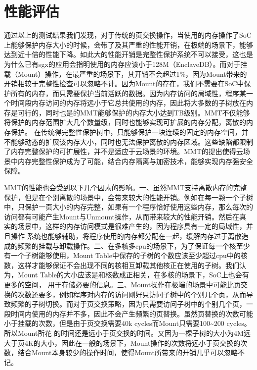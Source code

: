 \section{性能评估}
通过以上的测试结果我们发现，对于传统的页交换操作，当使用的内存操作了SoC上能够保护内存大小的时候，会带了及其严重的性能开销，在极端的场景下，能够达到近十倍的性能下降。如此大的性能开销是完整性保护系统不可以接受，这也是为什么已有sgx的应用会指明使用的内存应该小于128M（EnclaveDB）。而对于挂载（Mount）操作，在最严重的场景下，其开销不会超过1\%，因为Mount带来的
开销相较于完整性检查可以忽略不计。因为Mount的存在，我们不需要在SoC中保护所有的内存，而只需要保护当前活跃的数据。因为内存访问的局域性，程序某一个时间段内存访问的内存将远小于它总共使用的内存，因此将大多数的子树放在内存是可行的，同时也是的MMT能够保护的内存大小达到TB级别。MMT不仅能够将保护的内存范围扩大几个数量级，同时也能够实现可扩展的内存分配，离散的内存保护。
在传统得完整性保护树中，只能够保护一块连续的固定的内存空间，并不能够动态的扩展该内存大小，同时也无法保护离散的内存区域。这些缺陷都限制了内存完整保护的可扩展性，并不是适应于云场景的环境。MMT的提出使得云场景中内存完整性保护成为了可能，结合内存隔离与加密技术，能够实现内存强安全保障。

MMT的性能也会受到以下几个因素的影响。一、虽然MMT支持离散内存的完整保护，但是在个别离散的场景中，会带来较大的性能开销。例如在每一颗一个子树中，只保护一页大小的内存完整，如果有一个程序恰好使用这些内存，那么每次的访问都有可能产生Mount与Unmount操作，从而带来较大的性能开销。然后在真实的场景中，这样的内存访问模式是很难产生的，因为程序具有一定的局域性，并且操作
系统也能够辅助，将程序使用的内存都分配在一起，缓解内存过于离散造成的频繁的挂载与卸载操作。二、在多核多cpu的场景下，为了保证每一个核至少有一个子树能够使用，Mount Table中保存的子树的个数应该至少超过cpu中的核数，这样才能够保证不会出现不同的核相互卸载其他核正在使用的子树。我们认为，Mount Table的大小应该是和核数成正相关，在多核的场景下，SoC上也会有更多的空间，
用于存储必要的信息。三、Mount操作在极端的场景中可能比页交换的次数还要多，例如程序对内存的访问刚好只访问子树中的个别几个页，从而导致频繁的子树切换。而对于页交换策略，因为只需要访问子树中的个别几个页，一段时间内使用的内存并不多，因此不会产生频繁的页替换。虽然页替换的次数可能小于挂载的次数，但是由于页交换需要40k cycles而Mount只需要100\sim200 cycles。所以Mount所花
的时间还是远小于页交换的时间。又因为一棵子树的大小为4M远大于页4K的大小，因此在一般的场景下，Mount操作的次数将远小于页交换的次数，结合Mount本身较少的操作时间，使得Mount所带来的开销几乎可以忽略不记。


